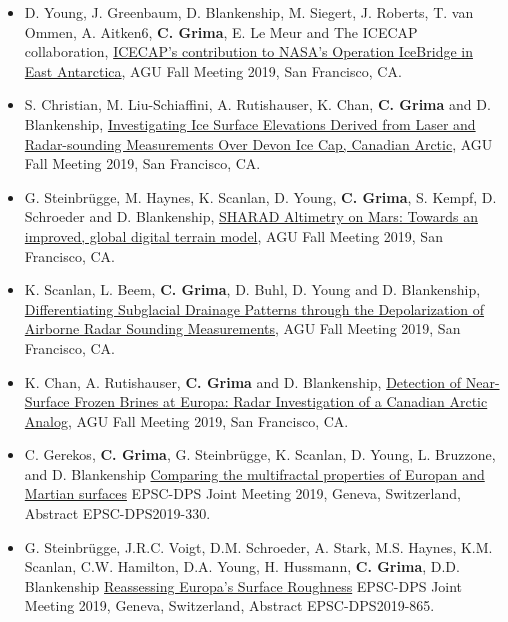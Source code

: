 \begin{itemize}
\item
  D. Young, J. Greenbaum, D. Blankenship, M. Siegert, J. Roberts, T. van Ommen, A. Aitken6, \textbf{C. Grima}, E. Le Meur and The ICECAP collaboration, \href{https://agu.confex.com/agu/fm19/meetingapp.cgi/Paper/610960}{ICECAP's contribution to NASA's Operation IceBridge in East Antarctica}, AGU Fall Meeting 2019, San Francisco, CA.
\item
  S. Christian, M. Liu-Schiaffini, A. Rutishauser, K. Chan, \textbf{C. Grima} and D. Blankenship, \href{https://agu.confex.com/agu/fm19/meetingapp.cgi/Paper/588389}{Investigating Ice Surface Elevations Derived from Laser and Radar-sounding Measurements Over Devon Ice Cap, Canadian Arctic}, AGU Fall Meeting 2019, San Francisco, CA.
\item
  G. Steinbrügge, M. Haynes, K. Scanlan, D. Young, \textbf{C. Grima}, S. Kempf, D. Schroeder and D. Blankenship, \href{https://agu.confex.com/agu/fm19/meetingapp.cgi/Paper/608483}{SHARAD Altimetry on Mars: Towards an improved, global digital terrain model}, AGU Fall Meeting 2019, San Francisco, CA.
\item
  K. Scanlan, L. Beem, \textbf{C. Grima}, D. Buhl, D. Young and D. Blankenship, \href{https://agu.confex.com/agu/fm19/meetingapp.cgi/Paper/600584}{Differentiating Subglacial Drainage Patterns through the Depolarization of Airborne Radar Sounding Measurements}, AGU Fall Meeting 2019, San Francisco, CA.
\item
  K. Chan, A. Rutishauser, \textbf{C. Grima} and D. Blankenship, \href{https://agu.confex.com/agu/fm19/meetingapp.cgi/Paper/591308}{Detection of Near-Surface Frozen Brines at Europa: Radar Investigation of a Canadian Arctic Analog}, AGU Fall Meeting 2019, San Francisco, CA.
\item
  C. Gerekos, \textbf{C. Grima}, G. Steinbrügge, K. Scanlan, D. Young,
  L. Bruzzone, and D. Blankenship
  \href{https://meetingorganizer.copernicus.org/EPSC-DPS2019/EPSC-DPS2019-330.pdf}{Comparing
  the multifractal properties of Europan and Martian surfaces} EPSC-DPS
  Joint Meeting 2019, Geneva, Switzerland, Abstract EPSC-DPS2019-330.
\item
  G. Steinbrügge, J.R.C. Voigt, D.M. Schroeder, A. Stark, M.S. Haynes,
  K.M. Scanlan, C.W. Hamilton, D.A. Young, H. Hussmann, \textbf{C.
  Grima}, D.D. Blankenship
  \href{https://meetingorganizer.copernicus.org/EPSC-DPS2019/EPSC-DPS2019-865-1.pdf}{Reassessing
  Europa's Surface Roughness} EPSC-DPS Joint Meeting 2019, Geneva,
  Switzerland, Abstract EPSC-DPS2019-865.

\end{itemize}
